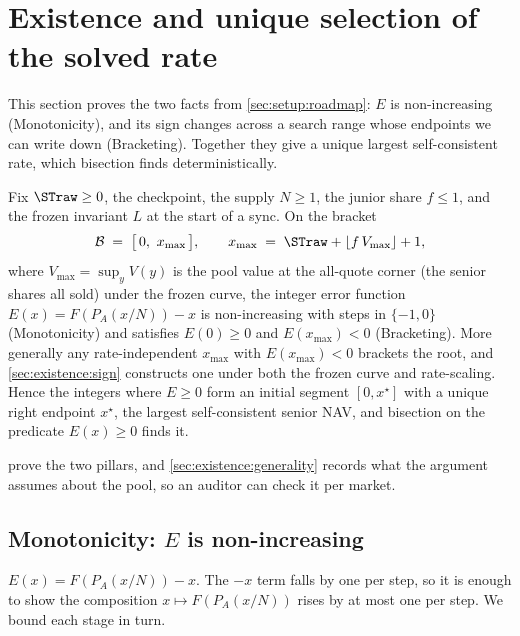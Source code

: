 \section{Existence and unique selection of the solved rate}
\label{sec:existence}

This section proves the two facts from \cref{sec:setup:roadmap}: $E$ is
non-increasing (Monotonicity), and its sign changes across a search range
whose endpoints we can write down (Bracketing). Together they give a unique
largest self-consistent rate, which bisection finds deterministically.

\begin{theorem}
\label{thm:main}
Fix $\STraw \geq 0$, the checkpoint, the supply $N \geq 1$, the junior
share $f \leq 1$, and the frozen invariant $L$ at the start of a sync. On the bracket
\[
  \mathcal{B} \;=\; \bigl[\,0,\ x_{\max}\,\bigr],
  \qquad
  x_{\max} \;=\; \STraw + \lfloor f\,V_{\max}\rfloor + 1,
\]
where $V_{\max} = \sup_y V(y)$ is the pool value at the all-quote corner
(the senior shares all sold) under the frozen curve, the integer error
function $E(x) = F(P_A(x/N)) - x$ is
non-increasing with steps in $\{-1, 0\}$ \textup{(Monotonicity)} and
satisfies $E(0) \geq 0$ and
$E(x_{\max}) < 0$ \textup{(Bracketing)}. More generally any
rate-independent $x_{\max}$ with $E(x_{\max}) < 0$ brackets the root, and
\cref{sec:existence:sign} constructs one under both the frozen curve and
rate-scaling. Hence the integers where $E \geq 0$
form an initial segment $[0, x^\star]$ with a unique right endpoint $x^\star$, the
largest self-consistent senior NAV, and bisection on the predicate
$E(x) \geq 0$ finds it.
\end{theorem}

 prove the two pillars, and
\cref{sec:existence:generality} records what the argument assumes about
the pool, so an auditor can check it per market.

\subsection{Monotonicity: $E$ is non-increasing}
\label{sec:existence:mono}

$E(x) = F(P_A(x/N)) - x$. The $-x$ term falls by one per step, so it is
enough to show the composition $x \mapsto F(P_A(x/N))$ rises by at most
one per step. We bound each stage in turn.

